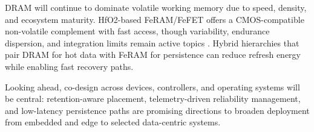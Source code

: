 
DRAM will continue to dominate volatile working memory due to speed, density, and ecosystem maturity. HfO2-based FeRAM/FeFET offers a CMOS-compatible non-volatile complement with fast access, though variability, endurance dispersion, and integration limits remain active topics \cite{noheda2023,martin2020}. Hybrid hierarchies that pair DRAM for hot data with FeRAM for persistence can reduce refresh energy while enabling fast recovery paths.

Looking ahead, co-design across devices, controllers, and operating systems will be central: retention-aware placement, telemetry-driven reliability management, and low-latency persistence paths are promising directions to broaden deployment from embedded and edge to selected data-centric systems.

